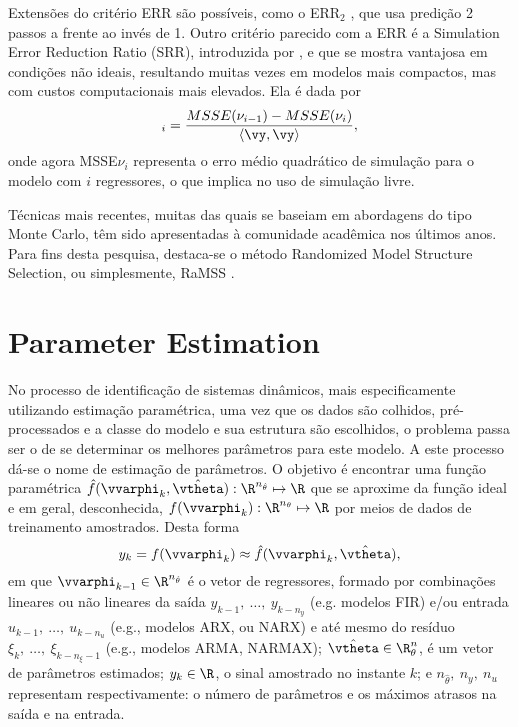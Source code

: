 Extensões do critério ERR são possíveis, como o ERR$_2$ \citep{alves2012}, que usa predição 2 passos a frente ao invés de 1.
Outro critério parecido com a ERR é a Simulation Error Reduction Ratio (SRR), introduzida por \citep{piroddi2003}, e que se mostra vantajosa em condições não ideais, resultando muitas vezes em modelos mais compactos, mas com custos computacionais mais elevados. Ela é dada por
\begin{equation}
[\text{SRR}]_i  = \frac{MSSE(\nu_{i-1})-MSSE(\nu_i)}{\langle\vy,\vy\rangle}
\label{eq:SRR},
\end{equation}
onde agora MSSE$\nu_i$ representa o erro médio quadrático de simulação para o modelo com $i$ regressores, o que implica no uso de simulação livre.

Técnicas mais recentes, muitas das quais se baseiam em abordagens do tipo Monte Carlo, têm sido apresentadas à comunidade acadêmica nos últimos anos. Para fins desta pesquisa, destaca-se o método Randomized Model Structure Selection, ou simplesmente, RaMSS \citep{falsone2014,falsone2015}.




\section{Parameter Estimation}%
\label{sec:parest}

No processo de identificação de sistemas dinâmicos, mais especificamente utilizando estimação paramétrica, uma vez que os dados são colhidos, pré-processados e a classe do modelo e sua estrutura são escolhidos, o problema passa ser o de se determinar os melhores parâmetros para este modelo. A este processo dá-se o nome de estimação de parâmetros. O objetivo é encontrar uma função paramétrica $\hat{f}(\vvarphi_{k},\hat{\vtheta}) :  \R^{n_{\hat{\theta}}} \mapsto \R$ que se aproxime da função ideal e em geral, desconhecida, $f(\vvarphi_{k}) : \R^{n_\theta} \mapsto \R$ por meios de dados de treinamento amostrados. Desta forma
\begin{equation}
    y_k = f(\vvarphi_{k}) \approx \hat{f}(\vvarphi_{k},\hat{\vtheta}),
\end{equation}
em que $\vvarphi_{k-1} \in \R^{n_{\hat{\theta}}}$ é o vetor de regressores, formado por combinações lineares ou não lineares da saída $y_{k-1},\  \dots ,\ y_{k-n_y}$ (e.g. modelos FIR) e/ou entrada $u_{k-1},\  \dots ,\ u_{k-n_u}$ (e.g., modelos ARX, ou NARX) e até mesmo do resíduo $\xi_{k},\  \dots ,\ \xi_{k-n_\xi-1}$ (e.g., modelos ARMA, NARMAX); $\hat{\vtheta} \in \R^n_\theta$, é um vetor de parâmetros estimados; $y_k \in \R$, o sinal amostrado no instante $k$; e $n_{\hat{\theta}},\ n_y,\ n_u$  representam respectivamente: o número de parâmetros e os máximos atrasos na saída e na entrada. 

